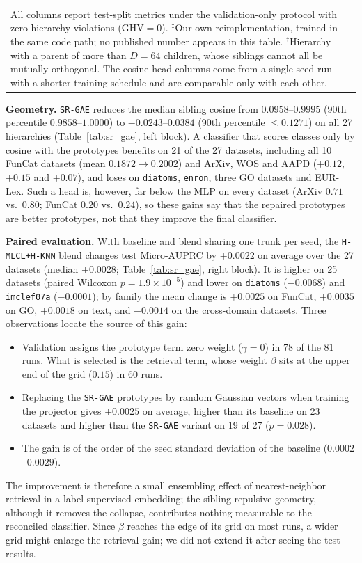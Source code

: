 \documentclass[preprint,12pt]{elsarticle}
\begin{document}
\begin{table}[htbp]
{\begin{tabular}{lcccccccccc}
\bottomrule
\multicolumn{11}{p{0.97\textwidth}}{\footnotesize All columns report test-split metrics under the validation-only protocol with zero hierarchy violations ($\text{GHV}=0$). $^{\ddagger}$Our own reimplementation, trained in the same code path; no published number appears in this table. $^\dagger$Hierarchy with a parent of more than $D=64$ children, whose siblings cannot all be mutually orthogonal. The cosine-head columns come from a single-seed run with a shorter training schedule and are comparable only with each other.}
\end{tabular}%
}
\end{table}

\textbf{Geometry.} \texttt{SR-GAE} reduces the median sibling cosine from
$0.0958$--$0.9995$ (90th percentile $0.9858$--$1.0000$) to
$-0.0243$--$0.0384$ (90th percentile $\le 0.1271$) on all 27 hierarchies
(Table~\ref{tab:sr_gae}, left block). A classifier that scores classes only
by cosine with the prototypes benefits on 21 of the 27 datasets, including
all 10 FunCat datasets (mean $0.1872 \to 0.2002$) and ArXiv, WOS and AAPD
($+0.12$, $+0.15$ and $+0.07$), and loses on \texttt{diatoms},
\texttt{enron}, three GO datasets and EUR-Lex. Such a head is, however, far
below the MLP on every dataset (ArXiv $0.71$ vs.\ $0.80$; FunCat $0.20$
vs.\ $0.24$), so these gains say that the repaired prototypes are better
prototypes, not that they improve the final classifier.

\textbf{Paired evaluation.} With baseline and blend sharing one trunk per
seed, the \texttt{H-MLCL+H-KNN} blend changes test Micro-AUPRC by $+0.0022$
on average over the 27 datasets (median $+0.0028$; Table~\ref{tab:sr_gae},
right block). It is higher on 25 datasets (paired Wilcoxon $p = 1.9 \times
10^{-5}$) and lower on \texttt{diatoms} ($-0.0068$) and \texttt{imclef07a}
($-0.0001$); by family the mean change is $+0.0025$ on FunCat, $+0.0035$ on
GO, $+0.0018$ on text, and $-0.0014$ on the cross-domain datasets. Three
observations locate the source of this gain:
\begin{itemize}[leftmargin=*,nosep]
  \item Validation assigns the prototype term zero weight ($\gamma = 0$) in
    78 of the 81 runs. What is selected is the retrieval term, whose weight
    $\beta$ sits at the upper end of the grid ($0.15$) in 60 runs.
  \item Replacing the \texttt{SR-GAE} prototypes by random Gaussian vectors
    when training the projector gives $+0.0025$ on average, higher than its
    baseline on 23 datasets and higher than the \texttt{SR-GAE} variant on
    19 of 27 ($p = 0.028$).
  \item The gain is of the order of the seed standard deviation of the
    baseline ($0.0002$--$0.0029$).
\end{itemize}
The improvement is therefore a small ensembling effect of nearest-neighbor
retrieval in a label-supervised embedding; the sibling-repulsive geometry,
although it removes the collapse, contributes nothing measurable to the
reconciled classifier. Since $\beta$ reaches the edge of its grid on most
runs, a wider grid might enlarge the retrieval gain; we did not extend it
after seeing the test results.
\end{document}
